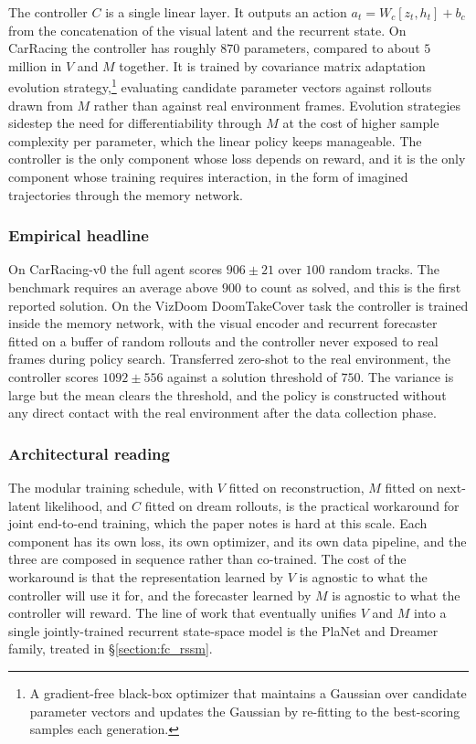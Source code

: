 The controller $C$ is a single linear layer. It outputs an action $a_t = W_c [z_t, h_t] + b_c$ from the concatenation of the visual latent and the recurrent state. On CarRacing the controller has roughly $870$ parameters, compared to about $5$ million in $V$ and $M$ together. It is trained by covariance matrix adaptation evolution strategy,\footnote{A gradient-free black-box optimizer that maintains a Gaussian over candidate parameter vectors and updates the Gaussian by re-fitting to the best-scoring samples each generation.} evaluating candidate parameter vectors against rollouts drawn from $M$ rather than against real environment frames. Evolution strategies sidestep the need for differentiability through $M$ at the cost of higher sample complexity per parameter, which the linear policy keeps manageable. The controller is the only component whose loss depends on reward, and it is the only component whose training requires interaction, in the form of imagined trajectories through the memory network.

\subsubsection{Empirical headline}
\label{section:fc_ha_schmidhuber_empirics}

On CarRacing-v0 the full agent scores $906 \pm 21$ over $100$ random tracks. The benchmark requires an average above $900$ to count as solved, and this is the first reported solution. On the VizDoom DoomTakeCover task the controller is trained inside the memory network, with the visual encoder and recurrent forecaster fitted on a buffer of random rollouts and the controller never exposed to real frames during policy search. Transferred zero-shot to the real environment, the controller scores $1092 \pm 556$ against a solution threshold of $750$. The variance is large but the mean clears the threshold, and the policy is constructed without any direct contact with the real environment after the data collection phase.

\subsubsection{Architectural reading}
\label{section:fc_ha_schmidhuber_reading}

The modular training schedule, with $V$ fitted on reconstruction, $M$ fitted on next-latent likelihood, and $C$ fitted on dream rollouts, is the practical workaround for joint end-to-end training, which the paper notes is hard at this scale. Each component has its own loss, its own optimizer, and its own data pipeline, and the three are composed in sequence rather than co-trained. The cost of the workaround is that the representation learned by $V$ is agnostic to what the controller will use it for, and the forecaster learned by $M$ is agnostic to what the controller will reward. The line of work that eventually unifies $V$ and $M$ into a single jointly-trained recurrent state-space model is the PlaNet and Dreamer family, treated in \S\ref{section:fc_rssm}.

